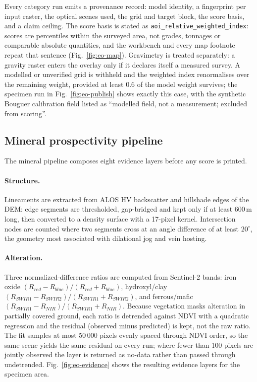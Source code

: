 \documentclass[10pt,a4paper,twocolumn]{article}
\begin{document}
Every category run emits a provenance record: model identity, a fingerprint per input
raster, the optical scenes used, the grid and target block, the score basis, and a
claim ceiling. The score basis is stated as \texttt{aoi\_relative\_weighted\_index}:
scores are percentiles within the surveyed area, not grades, tonnages or comparable
absolute quantities, and the workbench and every map footnote repeat that sentence
(Fig.~\ref{fig:eo-map}). Gravimetry is treated separately: a gravity raster enters the
overlay only if it declares itself a measured survey. A modelled or unverified grid is
withheld and the weighted index renormalises over the remaining weight, provided at
least 0.6 of the model weight survives; the specimen run in
Fig.~\ref{fig:eo-publish} shows exactly this case, with the synthetic Bouguer
calibration field listed as ``modelled field, not a measurement; excluded from
scoring''.

\subsection{Mineral prospectivity pipeline}

The mineral pipeline composes eight evidence layers before any score is printed.

\paragraph{Structure.} Lineaments are extracted from ALOS HV backscatter and
hillshade edges of the DEM: edge segments are thresholded, gap-bridged and kept only
if at least 600\,m long, then converted to a density surface with a 17-pixel kernel.
Intersection nodes are counted where two segments cross at an angle difference of at
least $20^\circ$, the geometry most associated with dilational jog and vein hosting.

\paragraph{Alteration.} Three normalized-difference ratios are computed from
Sentinel-2 bands: iron oxide $(R_{red}-R_{blue})/(R_{red}+R_{blue})$, hydroxyl/clay
$(R_{SWIR1}-R_{SWIR2})/(R_{SWIR1}+R_{SWIR2})$, and ferrous/mafic
$(R_{SWIR1}-R_{NIR})/(R_{SWIR1}+R_{NIR})$. Because vegetation masks alteration in
partially covered ground, each ratio is detrended against NDVI with a quadratic
regression and the residual (observed minus predicted) is kept, not the raw ratio.
The fit samples at most 50\,000 pixels evenly spaced through NDVI order, so the same
scene yields the same residual on every run; where fewer than 100 pixels are jointly
observed the layer is returned as no-data rather than passed through undetrended.
Fig.~\ref{fig:eo-evidence} shows the resulting evidence layers for the specimen area.
\end{document}
